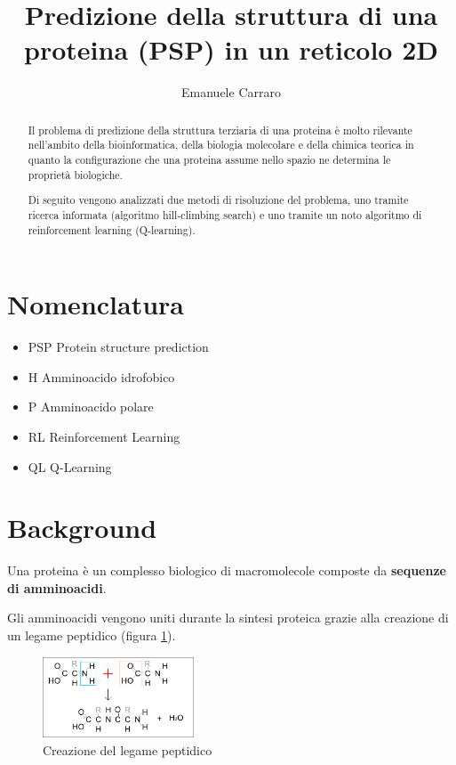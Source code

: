 \documentclass[conference]{IEEEtran}
\title{Predizione della struttura di una proteina (PSP) in un reticolo 2D}
\author{Emanuele Carraro}
\begin{document}
\maketitle    

\begin{abstract}
Il problema di predizione della struttura terziaria di una proteina è molto rilevante nell'ambito della bioinformatica, della biologia molecolare e della chimica teorica in quanto la configurazione che una proteina assume nello spazio ne determina le proprietà biologiche.

Di seguito vengono analizzati due metodi di risoluzione del problema, uno tramite ricerca informata (algoritmo hill-climbing search) e uno tramite un noto algoritmo di reinforcement learning (Q-learning).
\end{abstract}

\section{Nomenclatura}

\begin{itemize}
 \item PSP Protein structure prediction
 \item H Amminoacido idrofobico
 \item P Amminoacido polare
 \item RL Reinforcement Learning
 \item QL Q-Learning
\end{itemize}

\section{Background}

Una proteina è un complesso biologico di macromolecole composte da \textbf{sequenze di amminoacidi}.

Gli amminoacidi vengono uniti durante la sintesi proteica grazie alla creazione di un legame peptidico (figura \ref{fig:pept}).

\begin{figure}[h]
\centering
\includegraphics[width=0.4\textwidth]{figure/peptideBond.png}
\caption{Creazione del legame peptidico}
\label{fig:pept}
\end{figure}
\end{document}
